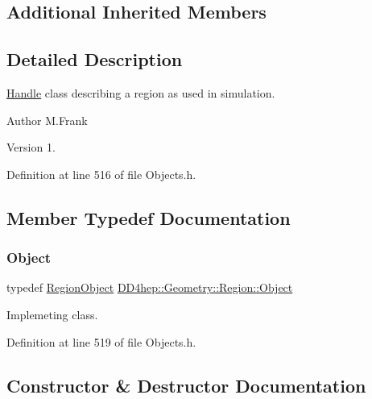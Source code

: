 \subsection*{Additional Inherited Members}


\subsection{Detailed Description}
\hyperlink{class_d_d4hep_1_1_handle}{Handle} class describing a region as used in simulation. 

\begin{DoxyAuthor}{Author}
M.\+Frank 
\end{DoxyAuthor}
\begin{DoxyVersion}{Version}
1. 
\end{DoxyVersion}


Definition at line 516 of file Objects.\+h.



\subsection{Member Typedef Documentation}
\hypertarget{class_d_d4hep_1_1_geometry_1_1_region_ab66f17984d7dad2a865c8950b3604503}{}\label{class_d_d4hep_1_1_geometry_1_1_region_ab66f17984d7dad2a865c8950b3604503} 
\subsubsection{\texorpdfstring{Object}{Object}}
{\footnotesize\ttfamily typedef \hyperlink{class_d_d4hep_1_1_geometry_1_1_region_object}{Region\+Object} \hyperlink{class_d_d4hep_1_1_geometry_1_1_region_ab66f17984d7dad2a865c8950b3604503}{D\+D4hep\+::\+Geometry\+::\+Region\+::\+Object}}



Implemeting class. 



Definition at line 519 of file Objects.\+h.



\subsection{Constructor \& Destructor Documentation}
\hypertarget{class_d_d4hep_1_1_geometry_1_1_region_ac8a2149581dcb28deb871bc812749cd7}{}\label{class_d_d4hep_1_1_geometry_1_1_region_ac8a2149581dcb28deb871bc812749cd7} 
